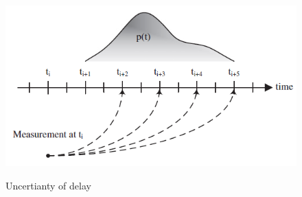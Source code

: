 \begin{figure}
	{\includegraphics[width=1.0\columnwidth]{./img/delay_uncertainty.png}}
	\caption{Uncertianty of delay}
	\label{fig:delay_uncertainty}
\end{figure}

